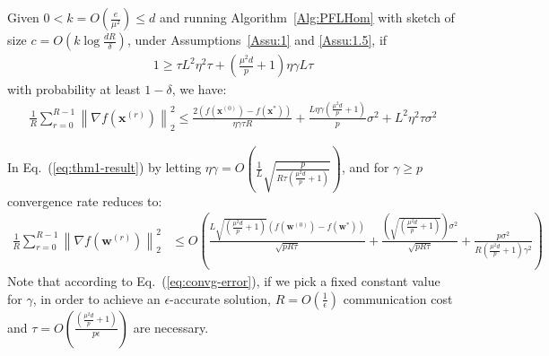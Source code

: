 




\begin{theorem}
Given $0<k=O\left(\frac{e}{\mu^2}\right)\leq d$
and running Algorithm~\ref{Alg:PFLHom} with sketch of size $c=O\left(k\log \frac{d R}{\delta}\right)$,  under Assumptions~\ref{Assu:1} and \ref{Assu:1.5}, if 
\begin{align}
   1\geq {\tau L^2\eta^2\tau}+(\frac{\mu^2 d}{p}+1)\eta\gamma L{\tau}\label{eq:cnd-lrs-h} 
\end{align}
with probability at least $1-\delta$, we have:
\begin{align}\label{eq:thm1-result}
    \frac{1}{R}\sum_{r=0}^{R-1}\left\|\nabla f({\boldsymbol{x}}^{(r)})\right\|_2^2\leq \frac{2\left(f(\boldsymbol{x}^{(0)})-f(\boldsymbol{x}^{*})\right)}{\eta\gamma\tau R}+\frac{L\eta\gamma(\frac{\mu^2 d}{p}+1)}{p}\sigma^2+{L^2\eta^2\tau }\sigma^2
\end{align}
\end{theorem}


\begin{corollary} 
In Eq.~(\ref{eq:thm1-result}) by letting $\eta\gamma=O\left(\frac{1}{L}\sqrt{\frac{p}{R\tau\left(\frac{\mu^2 d}{p}+1\right)}}\right)$, and for $\gamma\geq p$  convergence rate reduces to:
\begin{align}
    \frac{1}{R}\sum_{r=0}^{R-1}\left\|\nabla f({\boldsymbol{w}}^{(r)})\right\|_2^2&\leq O\left(\frac{L\sqrt{\left(\frac{\mu^2 d}{p}+1\right)}\left(f(\boldsymbol{w}^{(0)})-f(\boldsymbol{w}^{*})\right)}{\sqrt{pR\tau}}+\frac{\left(\sqrt{\left(\frac{\mu^2 d}{p}+1\right)}\right)\sigma^2}{\sqrt{pR\tau}}+\frac{p\sigma^2}{R\left(\frac{\mu^2 d}{p}+1\right)\gamma^2}\right)\label{eq:convg-error}
\end{align}
Note that according to Eq.~(\ref{eq:convg-error}), if we pick  a fixed constant value for  $\gamma$, in order to achieve an $\epsilon$-accurate solution, $R=O\left(\frac{1}{\epsilon}\right)$ communication cost and $\tau=O\left(\frac{\left(\frac{\mu^2 d}{p}+1\right)}{p\epsilon}\right)$ are necessary.

\end{corollary}




